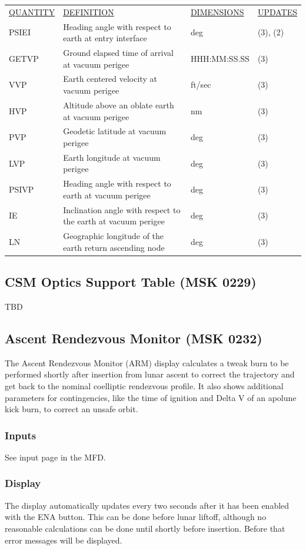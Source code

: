 \documentclass[11pt]{article} %
\begin{document}
\begin{center}
\begin{tabular}{ L{2.4cm} L{5.1cm} L{3cm} L{3.8cm} }
\underline{QUANTITY} & \underline{DEFINITION} & \underline{DIMENSIONS} & \underline{UPDATES} \\
PSIEI & Heading angle with respect to earth at entry interface & deg & (3), (2)\\
GETVP & Ground elapsed time of arrival at vacuum perigee & HHH:MM:SS.SS & (3)\\
VVP & Earth centered velocity at vacuum perigee & ft/sec & (3)\\
HVP & Altitude above an oblate earth at vacuum perigee & nm & (3)\\
PVP & Geodetic latitude at vacuum perigee & deg & (3)\\
LVP & Earth longitude at vacuum perigee & deg & (3)\\
PSIVP & Heading angle with respect to earth at vacuum perigee & deg & (3)\\
IE & Inclination angle with respect to the earth at vacuum perigee & deg & (3)\\
LN & Geographic longitude of the earth return ascending node & deg & (3)\\
\end{tabular}
\end{center}

\newpage
\subsection{CSM Optics Support Table (MSK 0229)}

TBD
\newpage
\subsection{Ascent Rendezvous Monitor (MSK 0232)}

The Ascent Rendezvous Monitor (ARM) display calculates a tweak burn to be performed shortly after insertion from lunar ascent to correct the trajectory and get back to the nominal coelliptic rendezvous profile. It also shows additional parameters for contingencies, like the time of ignition and Delta V of an apolune kick burn, to correct an unsafe orbit.
\subsubsection{Inputs}
See input page in the MFD.
\subsubsection{Display}
The display automatically updates every two seconds after it has been enabled with the ENA button. This can be done before lunar liftoff, although no reasonable calculations can be done until shortly before insertion. Before that error messages will be displayed.\\
\end{document}
